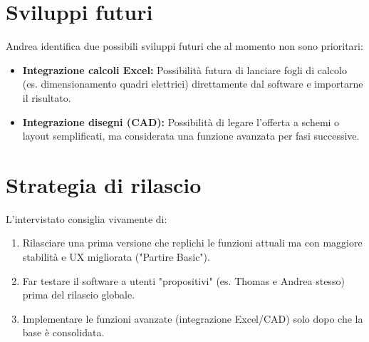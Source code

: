 \documentclass[12pt, a4paper]{article} %
\begin{document}
\section{Sviluppi futuri}
Andrea identifica due possibili sviluppi futuri che al momento non sono
prioritari:
\begin{itemize}
    \item \textbf{Integrazione calcoli Excel:} Possibilità futura di lanciare fogli di calcolo (es. dimensionamento quadri elettrici) direttamente dal software e importarne il risultato.
    \item \textbf{Integrazione disegni (CAD):} Possibilità di legare l'offerta a schemi o layout semplificati, ma considerata una funzione avanzata per fasi successive.
\end{itemize}

\section{Strategia di rilascio}
L'intervistato consiglia vivamente di:
\begin{enumerate}
    \item Rilasciare una prima versione che replichi le funzioni attuali ma con maggiore
          stabilità e UX migliorata ("Partire Basic").
    \item Far testare il software a utenti "propositivi" (es. Thomas e Andrea stesso)
          prima del rilascio globale.
    \item Implementare le funzioni avanzate (integrazione Excel/CAD) solo dopo che la
          base è consolidata.
\end{enumerate}
\end{document}

